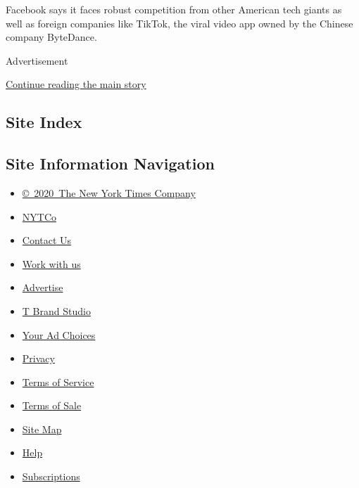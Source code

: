 Facebook says it faces robust competition from other American tech
giants as well as foreign companies like TikTok, the viral video app
owned by the Chinese company ByteDance.

Advertisement

\protect\hyperlink{after-bottom}{Continue reading the main story}

\hypertarget{site-index}{%
\subsection{Site Index}\label{site-index}}

\hypertarget{site-information-navigation}{%
\subsection{Site Information
Navigation}\label{site-information-navigation}}

\begin{itemize}
\tightlist
\item
  \href{https://help.nytimes3xbfgragh.onion/hc/en-us/articles/115014792127-Copyright-notice}{©~2020~The
  New York Times Company}
\end{itemize}

\begin{itemize}
\tightlist
\item
  \href{https://www.nytco.com/}{NYTCo}
\item
  \href{https://help.nytimes3xbfgragh.onion/hc/en-us/articles/115015385887-Contact-Us}{Contact
  Us}
\item
  \href{https://www.nytco.com/careers/}{Work with us}
\item
  \href{https://nytmediakit.com/}{Advertise}
\item
  \href{http://www.tbrandstudio.com/}{T Brand Studio}
\item
  \href{https://www.nytimes3xbfgragh.onion/privacy/cookie-policy\#how-do-i-manage-trackers}{Your
  Ad Choices}
\item
  \href{https://www.nytimes3xbfgragh.onion/privacy}{Privacy}
\item
  \href{https://help.nytimes3xbfgragh.onion/hc/en-us/articles/115014893428-Terms-of-service}{Terms
  of Service}
\item
  \href{https://help.nytimes3xbfgragh.onion/hc/en-us/articles/115014893968-Terms-of-sale}{Terms
  of Sale}
\item
  \href{https://spiderbites.nytimes3xbfgragh.onion}{Site Map}
\item
  \href{https://help.nytimes3xbfgragh.onion/hc/en-us}{Help}
\item
  \href{https://www.nytimes3xbfgragh.onion/subscription?campaignId=37WXW}{Subscriptions}
\end{itemize}
